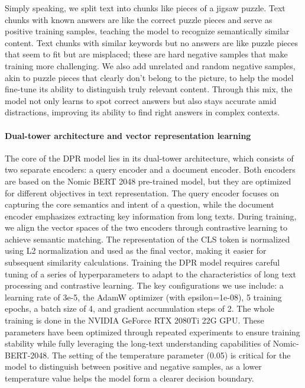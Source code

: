\documentclass[twoside]{article}
\begin{document}
Simply speaking, we split text into chunks like pieces of a jigsaw puzzle. Text chunks with known answers are like the correct puzzle pieces and 
serve as positive training samples, teaching the model to recognize semantically similar content. Text chunks with similar keywords but no answers 
are like puzzle pieces that seem to fit but are misplaced; these are hard negative samples that make training more challenging. We also add unrelated 
and random negative samples, akin to puzzle pieces that clearly don't belong to the picture, to help the model fine-tune its ability to distinguish 
truly relevant content. Through this mix, the model not only learns to spot correct answers but also stays accurate amid distractions, improving its ability 
to find right answers in complex contexts.

\paragraph*{Dual-tower architecture and vector representation learning}

The core of the DPR model lies in its dual-tower architecture, which consists of two separate encoders: a query encoder and a document encoder. Both encoders 
are based on the Nomic BERT 2048 pre-trained model, but they are optimized for different objectives in text representation. The query encoder focuses on capturing the 
core semantics and intent of a question, while the document encoder emphasizes extracting key information from long texts. During training, we align the vector spaces 
of the two encoders through contrastive learning to achieve semantic matching. The representation of the CLS token is normalized using L2 normalization and used as the 
final vector, making it easier for subsequent similarity calculations. Training the DPR model requires careful tuning of a series of hyperparameters to adapt to the 
characteristics of long text processing and contrastive learning. The key configurations we use include: a learning rate of 3e-5, the AdamW optimizer (with epsilon=1e-08), 
5 training epochs, a batch size of 4, and gradient accumulation steps of 2. The whole training is done in the NVIDIA GeForce RTX 2080Ti 22G GPU. These parameters 
have been optimized through repeated experiments to ensure training stability while fully leveraging the long-text understanding capabilities of Nomic-BERT-2048. 
The setting of the temperature parameter (0.05) is critical for the model to distinguish between positive and negative samples, as a lower temperature value helps the model 
form a clearer decision boundary.
\end{document}
